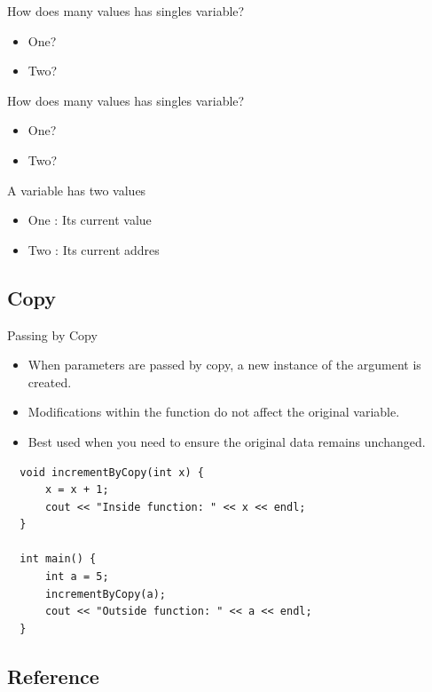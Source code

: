 \documentclass[10pt]{beamer}
\begin{document}
\begin{frame}{How does many values has singles variable?}
  \begin{itemize}
    \item One?
    \item Two?
  \end{itemize}
\end{frame}\begin{frame}{How does many values has singles variable?}
  \begin{itemize}
    \item One?
    \item Two?
  \end{itemize}
\end{frame}

\begin{frame}{A variable has two values}
  \begin{itemize}
    \item One : Its current value 
    \item Two : Its current addres
  \end{itemize}
\end{frame}

\subsection{Copy}
\begin{frame}[fragile]{Passing by Copy}
  \begin{itemize}
    \item When parameters are passed by copy, a new instance of the argument is created.
    \item Modifications within the function do not affect the original variable.
    \item Best used when you need to ensure the original data remains unchanged.
\end{itemize}

\begin{lstlisting}
  void incrementByCopy(int x) {
      x = x + 1;
      cout << "Inside function: " << x << endl;
  }
  
  int main() {
      int a = 5;
      incrementByCopy(a);
      cout << "Outside function: " << a << endl;
  }
  \end{lstlisting}

\end{frame}

\subsection{Reference}
\end{document}
